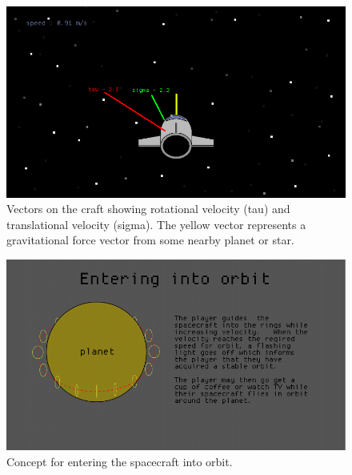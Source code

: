\begin{figure}[H]
  \centering
  \includegraphics[scale=0.5]{../images/vectors.png}
  \caption{Vectors on the craft showing rotational velocity (tau) and translational velocity (sigma).  The yellow vector represents a gravitational force vector from some nearby planet or star.}
\end{figure}

\begin{figure}[H]
  \centering
  \includegraphics[scale=0.5]{../images/orbit.png}
  \caption{Concept for entering the spacecraft into orbit.}
\end{figure}





